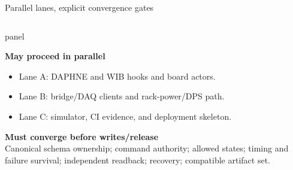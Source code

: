 \documentclass[aspectratio=169,10pt]{beamer}
\newcommand{\tightitem}{%
  \setlength{\itemsep}{0.8mm}%
  \setlength{\parskip}{0pt}%
}
\newcommand{\fixedpanel}[4][panel]{%
  \begin{beamercolorbox}[wd=\linewidth,sep=4pt,rounded=true]{#1}
    \begin{minipage}[t][#2][t]{\dimexpr\linewidth-8pt\relax}
      \raggedright
      {\usebeamercolor[fg]{#1}\bfseries #3\par}
      \vspace{0.45mm}
      {\usebeamercolor[fg]{#1}\footnotesize #4\par}
    \end{minipage}
  \end{beamercolorbox}
}
\begin{document}
\begin{frame}[t]{Parallel lanes, explicit convergence gates}
\begin{columns}[T,onlytextwidth]
\fixedpanel{5.2cm}{May proceed in parallel}{
\begin{itemize}\tightitem
  \item Lane A: DAPHNE and WIB hooks and board actors.
  \item Lane B: bridge/DAQ clients and rack-power/DPS path.
  \item Lane C: simulator, CI evidence, and deployment skeleton.
\end{itemize}
\vspace{1mm}
\textcolor{riskred}{\bfseries Must converge before writes/release}\\
Canonical schema ownership; command authority; allowed states; timing and
failure survival; independent readback; recovery; compatible artifact set.
}
\end{columns}
\end{frame}
\end{document}

